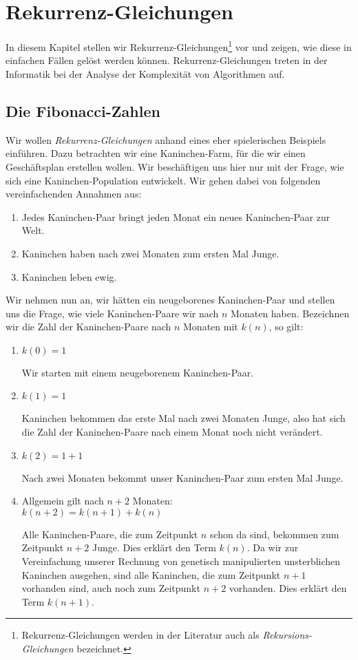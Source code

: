 \chapter{Rekurrenz-Gleichungen} 
In diesem Kapitel stellen wir 
Rekurrenz-Gleichungen\footnote{
Rekurrenz-Gleichungen werden in der Literatur auch als \emph{Rekursions-Gleichungen} bezeichnet.}
vor und zeigen, wie diese in einfachen F\"{a}llen gel\"{o}st werden k\"{o}nnen.  
Rekurrenz-Gleichungen treten in der Informatik bei der Analyse der Komplexit\"{a}t von
Algorithmen auf.


\section{Die Fibonacci-Zahlen}
Wir wollen \emph{Rekurrenz-Gleichungen} anhand eines eher spielerischen Beispiels
einf\"{u}hren.  Dazu betrachten wir eine Kaninchen-Farm, f\"{u}r die wir einen Gesch\"{a}ftsplan
erstellen wollen.   Wir besch\"{a}ftigen uns hier nur mit der Frage, wie sich eine
Kaninchen-Population entwickelt.  Wir gehen dabei von folgenden vereinfachenden Annahmen aus:
\begin{enumerate}
\item Jedes Kaninchen-Paar bringt jeden Monat ein neues Kaninchen-Paar zur Welt.
\item Kaninchen haben nach zwei Monaten zum ersten Mal Junge.
\item Kaninchen leben ewig.
\end{enumerate}
Wir nehmen nun an, wir h\"{a}tten ein neugeborenes Kaninchen-Paar und stellen uns die Frage, wie
viele Kaninchen-Paare wir nach $n$ Monaten haben.  Bezeichnen wir die Zahl der
Kaninchen-Paare nach $n$ Monaten mit $k(n)$, so gilt:
\begin{enumerate}
\item $k(0) = 1$

      Wir starten mit einem neugeborenem Kaninchen-Paar.
\item $k(1) = 1$

      Kaninchen bekommen das erste Mal nach zwei Monaten Junge, also hat sich die Zahl
      der Kaninchen-Paare nach einem Monat noch nicht ver\"{a}ndert.
\item $k(2) = 1 + 1$

      Nach zwei Monaten bekommt unser Kaninchen-Paar zum ersten Mal Junge.
\item Allgemein gilt nach $n + 2$ Monaten: \\[0.2cm]
      \hspace*{1.3cm} 
      $k(n+2) = k(n+1) + k(n)$

      Alle Kaninchen-Paare, die zum Zeitpunkt $n$ schon da sind, bekommen zum Zeitpunkt
      $n+2$ Junge. Dies erkl\"{a}rt den Term $k(n)$.  Da wir zur Vereinfachung unserer
      Rechnung von genetisch manipulierten unsterblichen Kaninchen ausgehen, sind alle
      Kaninchen, die zum Zeitpunkt $n+1$ vorhanden sind, auch noch zum Zeitpunkt $n+2$
      vorhanden. Dies erkl\"{a}rt den Term $k(n+1)$. 
\end{enumerate}
